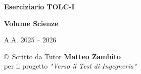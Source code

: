 \documentclass[20pt, a4paper]{article}
\begin{document}
\begin{titlepage}
    \centering
    \vspace*{2cm}
    {\Huge \textbf{Eserciziario TOLC-I} \par}
    \vspace{1cm}
    {\Large \textbf{Volume Scienze} \par}
    \vspace{4cm}
    {\Large A.A. 2025 -- 2026 \par}
    \vspace{4cm}
    \vfill
    {\large \copyright \ Scritto da Tutor \textbf{Matteo Zambito} \\
    per il progetto \textit{"Verso il Test di Ingegneria"} \par}
\end{titlepage}

\newpage
\tableofcontents
\newpage
\end{document}
